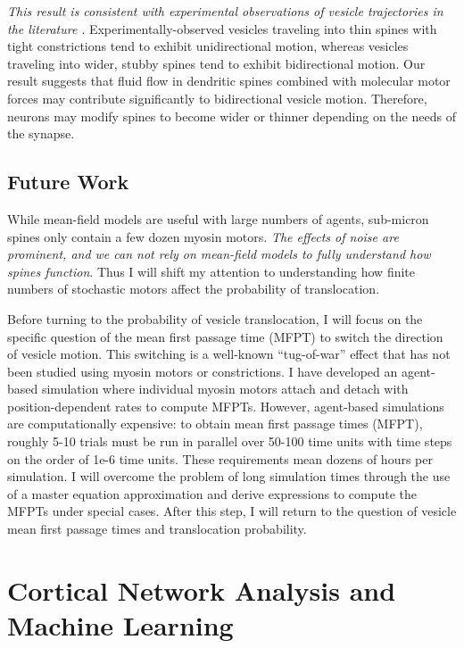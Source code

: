 \documentclass[a4paper,11pt]{article}
\begin{document}
	\textit{This result is consistent with experimental observations of vesicle trajectories in the literature \cite{park2020dynamics}}. Experimentally-observed vesicles traveling into thin spines with tight constrictions tend to exhibit unidirectional motion, whereas vesicles traveling into wider, stubby spines tend to exhibit bidirectional motion. Our result suggests that fluid flow in dendritic spines combined with molecular motor forces may contribute significantly to bidirectional vesicle motion. Therefore, neurons may modify spines to become wider or thinner depending on the needs of the synapse.
	
	\subsection{Future Work}
	While mean-field models are useful with large numbers of agents, sub-micron spines only contain a few dozen myosin motors. \textit{The effects of noise are prominent, and we can not rely on mean-field models to fully understand how spines function}. Thus I will shift my attention to understanding how finite numbers of stochastic motors affect the probability of translocation.
	
	Before turning to the probability of vesicle translocation, I will focus on the specific question of the mean first passage time (MFPT) to switch the direction of vesicle motion. This switching is a well-known ``tug-of-war'' effect \cite{julicher1995cooperative} that has not been studied using myosin motors or constrictions. I have developed an agent-based simulation where individual myosin motors attach and detach with position-dependent rates to compute MFPTs. However, agent-based simulations are computationally expensive: to obtain mean first passage times (MFPT), roughly 5-10 trials must be run in parallel over 50-100 time units with time steps on the order of 1e-6 time units. These requirements mean dozens of hours per simulation. I will overcome the problem of long simulation times through the use of a master equation approximation and derive expressions to compute the MFPTs under special cases. After this step, I will return to the question of vesicle mean first passage times and translocation probability.
	
	
	\section{Cortical Network Analysis and Machine Learning}\label{sec:data}
	
\end{document}
